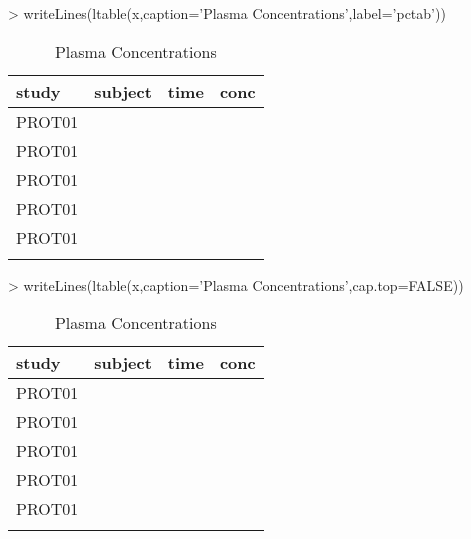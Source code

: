 \documentclass[titlepage]{article}
\begin{document}
\begin{Schunk}
\begin{Sinput}
> writeLines(ltable(x,caption='Plasma Concentrations',label='pctab'))
\end{Sinput}
\begin{table}[!htpb]
 \caption[Plasma Concentrations]{Plasma Concentrations \label{pctab}}
 \begin{center}
  \begin{tabular}{lrrr}
    \hline \hline
   study & subject & time & conc \\ \hline
   PROT01 & \verb#1001# & \verb#0# & \verb#0.12# \\
   PROT01 & \verb#1001# & \verb#1# & \verb#34.00# \\
   PROT01 & \verb#1001# & \verb#2# & \verb#5.60# \\
   PROT01 & \verb#1002# & \verb#0# & \verb#0.50# \\
   PROT01 & \verb#1002# & \verb#1# & \verb#200.00# \\
    & \verb#1002# & \verb#2# & \verb## \\ \hline
  \end{tabular}
 \end{center}
\end{table}\end{Schunk}
\begin{Schunk}
\begin{Sinput}
> writeLines(ltable(x,caption='Plasma Concentrations',cap.top=FALSE))
\end{Sinput}
\begin{table}[!htpb]
 \begin{center}
  \begin{tabular}{lrrr}
    \hline \hline
   study & subject & time & conc \\ \hline
   PROT01 & \verb#1001# & \verb#0# & \verb#0.12# \\
   PROT01 & \verb#1001# & \verb#1# & \verb#34.00# \\
   PROT01 & \verb#1001# & \verb#2# & \verb#5.60# \\
   PROT01 & \verb#1002# & \verb#0# & \verb#0.50# \\
   PROT01 & \verb#1002# & \verb#1# & \verb#200.00# \\
    & \verb#1002# & \verb#2# & \verb## \\ \hline
  \end{tabular}
 \end{center}
 \caption[Plasma Concentrations]{Plasma Concentrations }
\end{table}\end{Schunk}
\end{document}
